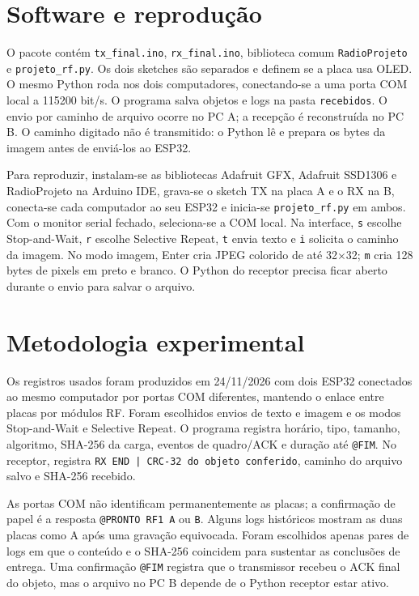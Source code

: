 \documentclass[12pt,a4paper]{article}
\begin{document}
\section{Software e reprodução}
O pacote contém \texttt{tx\_final.ino}, \texttt{rx\_final.ino}, biblioteca comum \texttt{RadioProjeto} e \texttt{projeto\_rf.py}. Os dois sketches são separados e definem se a placa usa OLED. O mesmo Python roda nos dois computadores, conectando-se a uma porta COM local a 115200 bit/s. O programa salva objetos e logs na pasta \texttt{recebidos}. O envio por caminho de arquivo ocorre no PC A; a recepção é reconstruída no PC B. O caminho digitado não é transmitido: o Python lê e prepara os bytes da imagem antes de enviá-los ao ESP32.

Para reproduzir, instalam-se as bibliotecas Adafruit GFX, Adafruit SSD1306 e RadioProjeto na Arduino IDE, grava-se o sketch TX na placa A e o RX na B, conecta-se cada computador ao seu ESP32 e inicia-se \texttt{projeto\_rf.py} em ambos. Com o monitor serial fechado, seleciona-se a COM local. Na interface, \texttt{s} escolhe Stop-and-Wait, \texttt{r} escolhe Selective Repeat, \texttt{t} envia texto e \texttt{i} solicita o caminho da imagem. No modo imagem, Enter cria JPEG colorido de até 32$\times$32; \texttt{m} cria 128 bytes de pixels em preto e branco. O Python do receptor precisa ficar aberto durante o envio para salvar o arquivo.

\section{Metodologia experimental}
Os registros usados foram produzidos em 24/11/2026 com dois ESP32 conectados ao mesmo computador por portas COM diferentes, mantendo o enlace entre placas por módulos RF. Foram escolhidos envios de texto e imagem e os modos Stop-and-Wait e Selective Repeat. O programa registra horário, tipo, tamanho, algoritmo, SHA-256 da carga, eventos de quadro/ACK e duração até \texttt{@FIM}. No receptor, registra \texttt{RX END | CRC-32 do objeto conferido}, caminho do arquivo salvo e SHA-256 recebido.

As portas COM não identificam permanentemente as placas; a confirmação de papel é a resposta \texttt{@PRONTO RF1 A} ou \texttt{B}. Alguns logs históricos mostram as duas placas como A após uma gravação equivocada. Foram escolhidos apenas pares de logs em que o conteúdo e o SHA-256 coincidem para sustentar as conclusões de entrega. Uma confirmação \texttt{@FIM} registra que o transmissor recebeu o ACK final do objeto, mas o arquivo no PC B depende de o Python receptor estar ativo.
\end{document}
